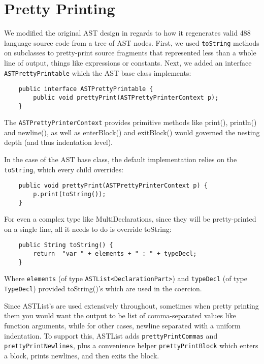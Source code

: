 \documentclass[oneside]{amsart}
\theoremstyle{definition}
\theoremstyle{remark}
\numberwithin{equation}{section}
\begin{document}
\section{Pretty Printing}
We modified the original AST design in regards to how it regenerates valid 488
language source code from a tree of AST nodes. First, we used \texttt{toString}
methods on subclasses to pretty-print source fragments that represented less
than a whole line of output, things like expressions or constants. Next, we
added an interface \texttt{ASTPrettyPrintable} which the AST base class
implements:

\begin{lstlisting}
    public interface ASTPrettyPrintable {
        public void prettyPrint(ASTPrettyPrinterContext p);
    }
\end{lstlisting}

The \texttt{ASTPrettyPrinterContext} provides primitive methods like print(),
println() and newline(), as well as enterBlock() and exitBlock() would governed
the nesting depth (and thus indentation level).

In the case of the AST base class, the default implementation relies on the
\texttt{toString}, which every child overrides:

\begin{lstlisting}
    public void prettyPrint(ASTPrettyPrinterContext p) {
        p.print(toString());
    }
\end{lstlisting}

For even a complex type like MultiDeclarations, since they will be
pretty-printed on a single line, all it needs to do is override toString:

\begin{lstlisting}
    public String toString() {
        return  "var " + elements + " : " + typeDecl;
    }
\end{lstlisting}

Where \texttt{elements} (of type \texttt{ASTList<DeclarationPart>}) and
\texttt{typeDecl} (of type \texttt{TypeDecl}) provided toString()'s which are
used in the coercion.

Since ASTList's are used extensively throughout, sometimes when pretty printing
them you would want the output to be list of comma-separated values like
function arguments, while for other cases, newline separated with a uniform
indentation. To support this, ASTList adds \texttt{prettyPrintCommas} and
\texttt{prettyPrintNewlines}, plus a convenience helper
\texttt{prettyPrintBlock} which enters a block, prints newlines, and then exits
the block.
\end{document}
